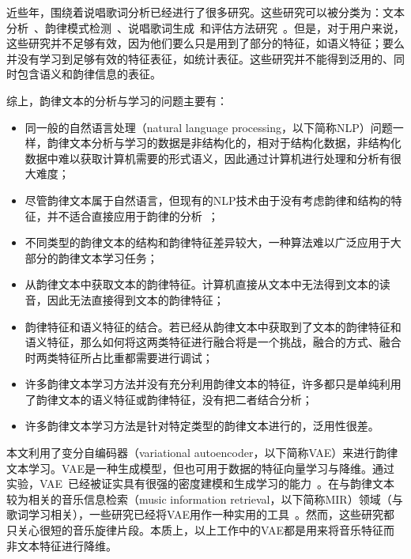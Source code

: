 近些年，围绕着说唱歌词分析已经进行了很多研究。这些研究可以被分类为：文本分析~\autocite{Potash2015GhostWriter}、韵律模式检测~\autocite{hirjee2010using,addanki2013unsupervised}、说唱歌词生成~\autocite{Potash2015GhostWriter,wu2013learning}和评估方法研究~\autocite{hirjee2010using,potash2016evaluating,Malmi2016dopelearning}。但是，对于用户来说，这些研究并不足够有效，因为他们要么只是用到了部分的特征，如语义特征；要么并没有学习到足够有效的特征表征，如统计表征。这些研究并不能得到泛用的、同时包含语义和韵律信息的表征。\par

综上，韵律文本的分析与学习的问题主要有：
\begin{itemize}
  \item 同一般的自然语言处理（natural language processing，以下简称NLP）问题一样，韵律文本分析与学习的数据是非结构化的，相对于结构化数据，非结构化数据中难以获取计算机需要的形式语义，因此通过计算机进行处理和分析有很大难度；
  \item 尽管韵律文本属于自然语言，但现有的NLP技术由于没有考虑韵律和结构的特征，并不适合直接应用于韵律的分析~\autocite{wu2013learning}；
  \item 不同类型的韵律文本的结构和韵律特征差异较大，一种算法难以广泛应用于大部分的韵律文本学习任务；
  \item 从韵律文本中获取文本的韵律特征。计算机直接从文本中无法得到文本的读音，因此无法直接得到文本的韵律特征；
  \item 韵律特征和语义特征的结合。若已经从韵律文本中获取到了文本的韵律特征和语义特征，那么如何将这两类特征进行融合将是一个挑战，融合的方式、融合时两类特征所占比重都需要进行调试；
  \item 许多韵律文本学习方法并没有充分利用韵律文本的特征，许多都只是单纯利用了韵律文本的语义特征或韵律特征，没有把二者结合分析；
  \item 许多韵律文本学习方法是针对特定类型的韵律文本进行的，泛用性很差。
\end{itemize}
\par

本文利用了变分自编码器（variational autoencoder，以下简称VAE）来进行韵律文本学习。VAE是一种生成模型，但也可用于数据的特征向量学习与降维。通过实验，VAE~\autocite{kingma2014auto}已经被证实具有很强的密度建模和生成学习的能力~\autocite{hou2017deep}。在与韵律文本较为相关的音乐信息检索（music information retrieval，以下简称MIR）领域（与歌词学习相关），一些研究已经将VAE用作一种实用的工具~\autocite{alexey2017music,hadjeres2017glsr}。然而，这些研究都只关心很短的音乐旋律片段。本质上，以上工作中的VAE都是用来将音乐特征而非文本特征进行降维。\par


